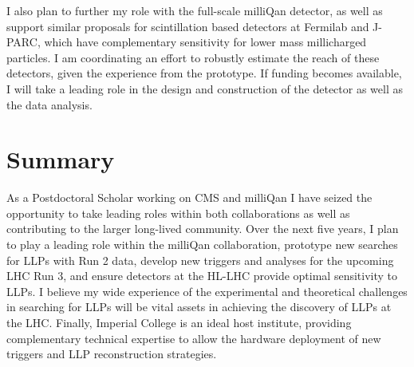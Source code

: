 \documentclass[11pt,twocolumn]{article}
\theoremstyle{plain} \numberwithin{equation}{section}
\theoremstyle{definition}
\begin{document}
I also plan to further my role with the full-scale milliQan detector, as well
as support similar proposals for scintillation based detectors at Fermilab and J-PARC, which
have complementary sensitivity for lower mass millicharged particles. I am coordinating an effort to
robustly estimate the reach of these detectors, given the experience from the prototype. 
If funding becomes available, I will take a leading
role in the design and construction of the detector as well as the data analysis.

\section*{Summary}

As a Postdoctoral Scholar working on CMS and milliQan
I have seized the opportunity to take leading roles within both collaborations
as well as contributing to the larger long-lived community.
Over the next five years, I plan to 
play a leading role within the milliQan collaboration, 
prototype new searches for LLPs with Run 2 data, develop new triggers and
analyses for the upcoming LHC Run 3, and ensure detectors at the HL-LHC
provide optimal sensitivity to LLPs. I believe my wide experience of the experimental
and theoretical challenges in searching for LLPs will be vital assets in achieving
the discovery of LLPs at the LHC. Finally, Imperial College is an ideal host institute, providing
complementary technical expertise to allow the hardware deployment of new triggers and LLP
reconstruction strategies.
\end{document}
